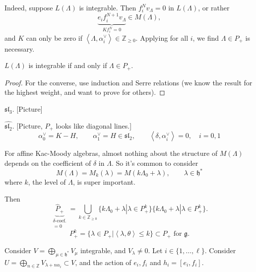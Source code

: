Indeed, suppose $L(\Lambda)$ is integrable.
Then $f_i^Nv_\Lambda=0$ in $L(\Lambda)$,
or rather 
$$
\underbrace{e_if_i^{N+1}v_\Lambda}
_{Kf_i^N=0} \in M(\Lambda),
$$
and $K$ can only be zero if $\left<\Lambda,\alpha_i^\vee\right>
\in \mathbb{Z}_{\geq 0}$. Applying for all $i$, we find
$\Lambda \in P_+$ is necessary.

\begin{proposition}
\label{proposition-integrable-iff-dominant-integral-weight}
$L(\Lambda)$ is integrable if and only if $\Lambda \in P_+$.
\end{proposition}

\begin{proof}
For the converse, use induction and Serre relations 
(we know the result for the highest weight, and want
to prove for others).
\end{proof}

\begin{example}
\label{example-sl3-integrability}
$\mathfrak{sl}_3$. [Picture]
\end{example}

\begin{example}
\label{example-sl_2hat-integrability}
$\widehat{\mathfrak{sl}_2}$. [Picture, $P_+$ looks like diagonal lines.]
$$
\alpha_0^\vee=K-H,\qquad \alpha_1^\vee=H\in\mathfrak{sl}_2,
\qquad \left<\delta,\alpha_i^\vee\right>=0,\quad i=0,1
$$
\end{example}

\begin{remark}
\label{remark-Verma-for-affine-Kac-Moody-algebras-
the-coefficient-of-K-is-super-important}
For affine Kac-Moody algebras, almost nothing about the structure of 
$M(\Lambda)$ depends on the coefficient of $\delta$ in $\Lambda$. 
So it's common to consider
$$
M(\Lambda)=M_k(\lambda)=M(k\Lambda_0+\lambda),\qquad \lambda \in \mathfrak{h}^*
$$
where $k$, the level of $\Lambda$, is super important.
\end{remark}

Then
$$
\underbrace{\hat{P}_+}_{
\substack{\delta\text{-coef.} \\ =0}}
=\bigcup_{k \in \mathbb{Z}_{\geq 0}}
\{k\Lambda_0+\lambda|\lambda \in P_+^k\}
\{k\Lambda_0+\lambda|\lambda \in P_+^k\}.
$$
$$
P_+^k=\{\lambda \in P_+|
\left<\lambda,\theta\right>\leq k\}\subset P_+ \text{ for }\mathfrak{g}.
$$

\medskip\noindent
Consider $V= \bigoplus_{\mu \in \mathfrak{h}^*}V_\mu$ integrable,
and $V_\lambda \neq 0$.
Let $i \in \{1,\ldots,\ell\}$.
Consider $U=\bigoplus_{n \in \mathbb{Z}}V_{\lambda+n\alpha_i}\subset V$,
and the action of $e_i,f_i$ and $h_i=[e_i,f_i]$.

